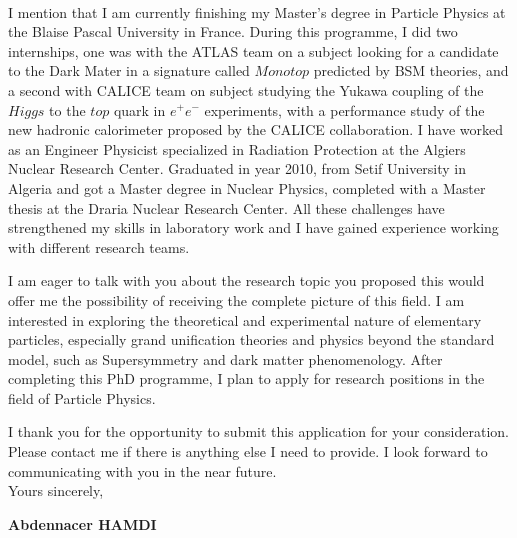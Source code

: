 \documentclass[11pt]{letter}
\begin{document}
~\par I mention that I am currently finishing my Master's degree in Particle Physics at the Blaise Pascal University in France. During this programme, I did two internships, one was with the ATLAS team on a subject looking for a candidate to the Dark Mater in a signature called $Monotop$ predicted by BSM theories, and a second with CALICE team on subject studying the Yukawa coupling of the $Higgs$ to the $top$ quark in $e^{+}e^{-}$ experiments, with a performance study of the new hadronic calorimeter proposed by the CALICE collaboration. I have worked as an Engineer Physicist specialized in Radiation Protection at the Algiers Nuclear Research Center. Graduated in year 2010, from Setif University in Algeria and got a Master degree in Nuclear Physics, completed with a Master thesis at the Draria Nuclear Research Center. All these challenges have strengthened my skills in laboratory work and I have gained experience working with different research teams.
~\par I am eager to talk with you about the research topic you proposed this would offer me the possibility of receiving the complete picture of this field.  I am interested in exploring the theoretical and experimental nature of elementary particles, especially grand unification theories and physics beyond the standard model, such as Supersymmetry and dark matter phenomenology. After completing this PhD programme, I plan to apply for research positions in the field of Particle Physics.
~\par I thank you for the opportunity to submit this application for your consideration. Please contact me if there is anything else I need to provide. I look forward to communicating with you in the near future.\\  %
Yours sincerely,

\begin{flushleft}
 {\bfseries Abdennacer HAMDI}
 \end{flushleft}
 \vfill
 
\end{document}
